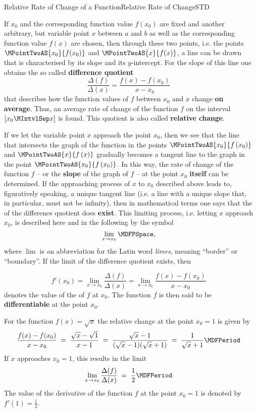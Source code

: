 \begin{MXContent}{Relative Rate of Change of a Function}{Relative Rate of Change}{STD}


If $x_0$ and the corresponding function value $f\left(x_0\right)$ are fixed and 
another arbitrary, but variable point $x$ between $a$ and $b$ as well as the 
corresponding function value $f\left(x\right)$ are chosen, then through these 
two points, i.e. the points $\MPointTwoAS{x_0}{f(x_0)}$ and $\MPointTwoAS{x}{f(x)}$, 
a line can be drawn that is characterised by its slope and its $y$-intercept. For the 
slope of this line one obtains the so called \textbf{difference quotient}
\[
\frac{\Delta(f)}{\Delta(x)} = \frac{f(x) - f(x_0)}{x - x_0}
\]
that describes how the function values of $f$ between $x_0$ and $x$ change \textbf{on average}.
Thus, an average rate of change of the function $f$ on the interval $[x_0\MIntvlSep  x]$ is found. 
This quotient is also called \textbf{relative change}.

If we let the variable point $x$ approach the point $x_0$, then we see that the line 
that intersects the graph of the function in the points $\MPointTwoAS{x_0}{f\left(x_0\right)}$ 
and $\MPointTwoAS{x}{f\left(x\right)}$ 
gradually becomes a tangent line to the graph in the point $\MPointTwoAS{x_0}{f\left(x_0\right)}$.
In this way, the rate of change of the function $f$ -- or the \textbf{slope} of the graph of 
$f$ -- at the point $x_0$ \textbf{itself} can be determined. If the approaching process 
of $x$ to $x_0$ described above leads to, figuratively speaking, a unique tangent line (i.e. a line with 
a unique slope that, in particular, must not be infinity), then in mathematical terms
one says that the  of the difference quotient does \textbf{exist}. 
This limiting process, i.e. letting $x$ approach $x_0$, is described here and in the following 
by the symbol 
\[
\lim_{x \rightarrow x_0} \MDFPSpace,
\]
where $\lim$ is an abbreviation for the Latin word \emph{limes}, meaning ``border'' or ``boundary''.
If the limit of the difference quotient exists, then

\[
f'(x_0) = \lim_{x \rightarrow x_0} \frac{\Delta(f)}{\Delta(x)} 
 = \lim_{x \rightarrow x_0} \frac{f(x) - f(x_0)}{x - x_0} %
\] 
denotes the value of the  of $f$ at $x_0$. The function $f$ is then 
said to be \textbf{differentiable} at the point $x_0$.

\begin{MExample}
  For the function $f(x)=\sqrt{x}$ the relative change at the point $x_0=1$ is given by
  \[
    \frac{f(x) - f(x_0)}{x - x_0} \;=\;
    \frac{\sqrt{x}-\sqrt{1}}{x-1} \;=\; \frac{\sqrt{x}-1}{(\sqrt{x}-1)(\sqrt{x}+1)} \;=\; \frac1{\sqrt{x}+1} \MDFPeriod
  \]
  If $x$ approaches $x_0=1$, this results in the limit
  $$
  \lim_{x \rightarrow x_0} \frac{\Delta(f)}{\Delta(x)} \;=\; \frac12 \MDFPeriod
  $$
  The value of the derivative of the function $f$ at the point $x_0=1$ is denoted by 
  $f'(1)=\frac12$.
\end{MExample}


\end{MXContent}
